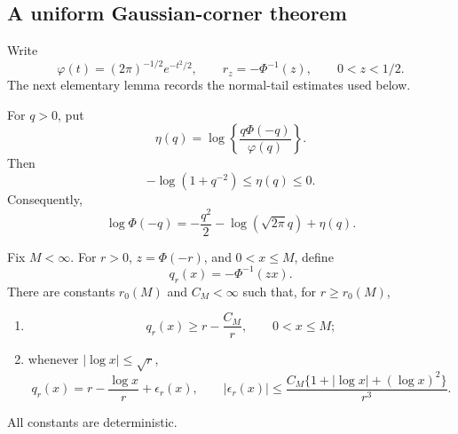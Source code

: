 
\subsection{A uniform Gaussian-corner theorem}

Write
\[
 \varphi(t)=(2\pi)^{-1/2}e^{-t^2/2},
 \qquad
 r_z=-\Phi^{-1}(z),\qquad 0<z<1/2.
\]
The next elementary lemma records the normal-tail estimates used below.

\begin{lemma}
\label{lem:uniform-normal-coordinate}
For \(q>0\), put
\[
 \eta(q)=\log\left\{\frac{q\Phi(-q)}{\varphi(q)}\right\}.
\]
Then
\begin{equation}
 -\log(1+q^{-2})\le \eta(q)\le0.
 \label{eq:normal-mills-log}
\end{equation}
Consequently,
\begin{equation}
 \log\Phi(-q)
 =
 -\frac{q^2}{2}-\log(\sqrt{2\pi}q)+\eta(q).
 \label{eq:normal-log-tail}
\end{equation}

Fix \(M<\infty\). For \(r>0\), \(z=\Phi(-r)\), and
\(0<x\le M\), define
\[
 q_r(x)=-\Phi^{-1}(zx).
\]
There are constants \(r_0(M)\) and \(C_M<\infty\) such that, for
\(r\ge r_0(M)\),

\begin{enumerate}
\item
\begin{equation}
 q_r(x)\ge r-\frac{C_M}{r},
 \qquad 0<x\le M;
 \label{eq:q-lower-uniform}
\end{equation}

\item whenever \(|\log x|\le\sqrt r\),
\begin{equation}
 q_r(x)
 =
 r-\frac{\log x}{r}+\epsilon_r(x),
 \qquad
 |\epsilon_r(x)|
 \le
 \frac{C_M\{1+|\log x|+(\log x)^2\}}{r^3}.
 \label{eq:q-expansion-uniform}
\end{equation}
\end{enumerate}
All constants are deterministic.
\end{lemma}

